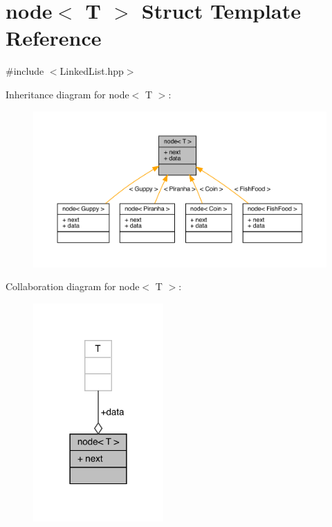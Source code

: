 \hypertarget{structnode}{}\section{node$<$ T $>$ Struct Template Reference}
\label{structnode}


{\ttfamily \#include $<$Linked\+List.\+hpp$>$}



Inheritance diagram for node$<$ T $>$\+:
\nopagebreak
\begin{figure}[H]
\begin{center}
\leavevmode
\includegraphics[width=350pt]{structnode__inherit__graph}
\end{center}
\end{figure}


Collaboration diagram for node$<$ T $>$\+:
\nopagebreak
\begin{figure}[H]
\begin{center}
\leavevmode
\includegraphics[width=141pt]{structnode__coll__graph}
\end{center}
\end{figure}

